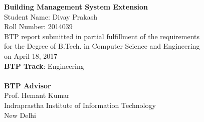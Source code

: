 \def\degree{B.Tech. in Computer Science and Engineering}
\def\btptrack{Engineering}
\def\submissiondate{April 18, 2017}
\def\supervisor{Prof. Hemant Kumar}
\def\student{Divay Prakash}
\def\rollnumber{2014039}
\def\titlelineone{Building Management System Extension}

\thispagestyle{empty}
\vspace{5.65in}

\begin{center}
\vspace{5.65in}
{\LARGE \bf \titlelineone{}\\}
\vspace{.3in}
{\Large{Student Name: \student{}}}\\  
{\large{Roll Number: \rollnumber{}}}\\
\vspace{.1in} 
\vspace{.65in}
\vspace{.65in}
{BTP report submitted in partial fulfillment of the requirements 
\\for the Degree of \degree{}\\}
on \submissiondate{}\\
\vspace{.65in}
\textbf{BTP Track}: \btptrack\\
\quad\\
{\textbf{BTP Advisor}\\ 
\supervisor\\} 
\vspace{3.0in}
{Indraprastha Institute of Information Technology\\
New Delhi}
\end{center}
